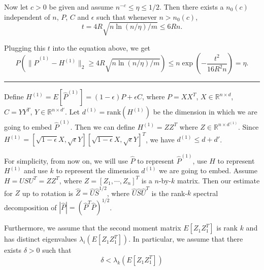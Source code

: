 \documentclass[a4paper]{article}
\newenvironment{proof}{{\bf Proof:  }}{\hfill\rule{2mm}{2mm}}
\renewcommand{\hat}{\widehat}
\begin{document}
\begin{proof}
Now let $c > 0$ be given and assume $n^{-c} \le \eta \le 1/2$. Then there exists a $n_0(c)$ independent of $n$, $P$, $C$ and $\epsilon$ such that whenever $n > n_0(c)$,
\[
	t =  4 R \sqrt{n \ln(n/\eta)/m} \le 6 R n.
\]

Plugging this $t$ into the equation above, we get
\[
	P(\| \hat{P}^{(1)} - H^{(1)} \|_2 \ge 4 R \sqrt{n \ln(n/\eta)/m})
    \le n \exp\left(-\frac{t^2}{16 R^2 n}\right) = \eta.
\]
\end{proof}

Define $H^{(1)} = E[\hat{P}^{(1)}] = (1-\epsilon) P + \epsilon C$, where $P = X X^T$, $X \in \mathbb{R}^{n \times d}$, $C = Y Y^T$, $Y \in \mathbb{R}^{n\times d'}$.
Let $d^{(1)} = \mathrm{rank}(H^{(1)})$ be the dimension in which we are going to embed $\hat{P}^{(1)}$. Then we can define $H^{(1)} = Z Z^T$ where $Z \in \mathbb{R}^{n \times d^{(1)}}$.
Since $H^{(1)} = [\sqrt{1-\epsilon} X, \sqrt{\epsilon} Y] [\sqrt{1-\epsilon} X, \sqrt{\epsilon} Y]^T$, we have $d^{(1)} \le d+d'$.


For simplicity, from now on, we will use $\hat{P}$ to represent $\hat{P}^{(1)}$, use $H$ to represent $H^{(1)}$ and use $k$ to represent the dimension $d^{(1)}$ we are going to embed. Assume $H = U S U^T = Z Z^T$, where $Z = [Z_1, \cdots, Z_n]^T$ is a $n$-by-$k$ matrix. Then our estimate for $Z$ up to rotation is $\hat{Z} = \hat{U} \hat{S}^{1/2}$, where $\hat{U} \hat{S} \hat{U}^T$ is the rank-$k$ spectral decomposition of $|\hat{P}| = (\hat{P}^T \hat{P})^{1/2}$.

Furthermore, we assume that the second moment matrix $E[Z_1 Z_1^T]$ is rank $k$ and has distinct eigenvalues $\lambda_i(E[Z_1 Z_1^T])$. In particular, we assume that there exists $\delta > 0$ such that
\[
	\delta < \lambda_k(E[Z_1 Z_1^T])
\]
\end{document}
